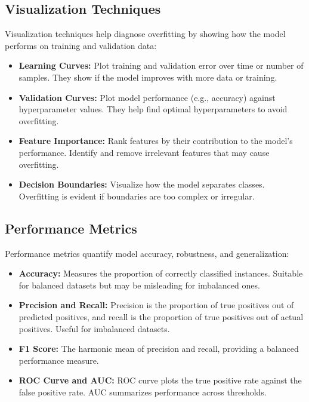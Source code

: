 \documentclass[12pt]{book} %
\begin{document}
\subsection{Visualization Techniques}

Visualization techniques help diagnose overfitting by showing how the model performs on training and validation data:

\begin{itemize}
    \item \textbf{Learning Curves:} Plot training and validation error over time or number of samples. They show if the model improves with more data or training.
    
    \item \textbf{Validation Curves:} Plot model performance (e.g., accuracy) against hyperparameter values. They help find optimal hyperparameters to avoid overfitting.
    
    \item \textbf{Feature Importance:} Rank features by their contribution to the model's performance. Identify and remove irrelevant features that may cause overfitting.
    
    \item \textbf{Decision Boundaries:} Visualize how the model separates classes. Overfitting is evident if boundaries are too complex or irregular.
\end{itemize}

\subsection{Performance Metrics}

Performance metrics quantify model accuracy, robustness, and generalization:

\begin{itemize}
    \item \textbf{Accuracy:} Measures the proportion of correctly classified instances. Suitable for balanced datasets but may be misleading for imbalanced ones.
    
    \item \textbf{Precision and Recall:} Precision is the proportion of true positives out of predicted positives, and recall is the proportion of true positives out of actual positives. Useful for imbalanced datasets.
    
    \item \textbf{F1 Score:} The harmonic mean of precision and recall, providing a balanced performance measure.
    
    \item \textbf{ROC Curve and AUC:} ROC curve plots the true positive rate against the false positive rate. AUC summarizes performance across thresholds.
\end{itemize}
\end{document}
